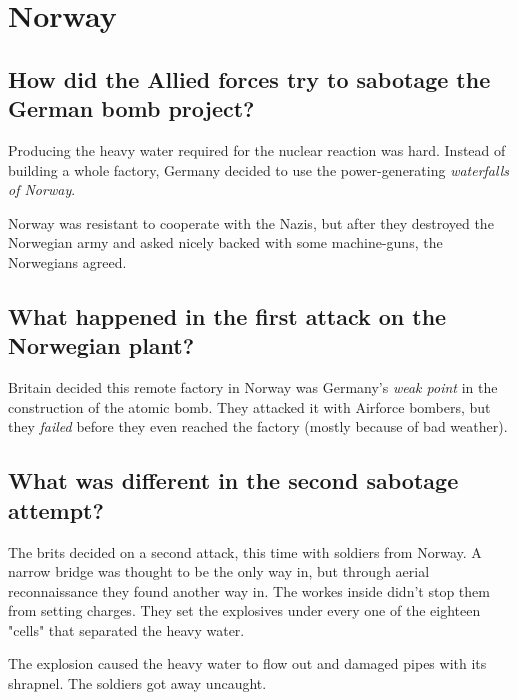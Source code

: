 %

\section{Norway}

\subsection*{How did the Allied forces try to sabotage the German bomb project?}
Producing the heavy water required for the nuclear reaction was hard. Instead of building a whole factory, Germany decided to use the power-generating \emph{waterfalls of Norway}.

Norway was resistant to cooperate with the Nazis, but after they destroyed the Norwegian army and asked nicely backed with some machine-guns, the Norwegians agreed.

\subsection*{What happened in the first attack on the Norwegian plant?}
Britain decided this remote factory in Norway was Germany's \emph{weak point} in the construction of the atomic bomb. They attacked it with Airforce bombers, but they \emph{failed} before they even reached the factory (mostly because of bad weather).

\subsection*{What was different in the second sabotage attempt?}
The brits decided on a second attack, this time with soldiers from Norway.
A narrow bridge was thought to be the only way in, but through aerial reconnaissance they found another way in. The workes inside didn't stop them from setting charges. They set the explosives under every one of the eighteen "cells" that separated the heavy water.

The explosion caused the heavy water to flow out and damaged pipes with its shrapnel. The soldiers got away uncaught.
